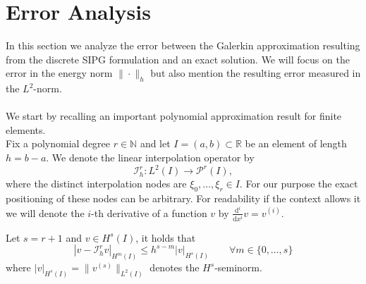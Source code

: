 \section{Error Analysis}
In this section we analyze the error between the Galerkin approximation resulting from the discrete SIPG formulation and an exact solution. 
We will focus on the error in the energy norm $\| \cdot \|_{h}$ but also mention the resulting error measured in the $L^2$-norm.
\\ \\
We start by recalling an important polynomial approximation result for finite elements. \\
Fix a polynomial degree $r \in \mathbb{N}$ and let $I = (a, b) \subset \mathbb{R}$ be an element of length $h = b-a$. We denote the linear interpolation operator by
\begin{equation}
	\mathcal{I}_h^r : L^2(I) \to \mathcal{P}^r(I),
\end{equation}
where the distinct interpolation nodes are $\xi_0,\ldots,\xi_r \in I$. For our purpose the exact positioning of these nodes can be arbitrary. 
For readability if the context allows it we will denote the $i$-th derivative of a function $v$ by $\frac{\text{d}^i}{\text{d} x^i} v = v^{(i)}$.
\begin{lemma}
	Let $s = r+1$ and $v \in H^s(I)$, it holds that 
	\begin{equation*}
		| v - \mathcal{I}_h^r v |_{H^m(I)} \leq  h^{s-m} |v|_{H^s(I)} \qquad \forall m \in \{0,\ldots,s\}
	\end{equation*} 
	where $|v|_{H^s(I)} = \| v^{(s)} \|_{L^2(I)}$ denotes the $H^s$-seminorm. \\ 
\end{lemma}
